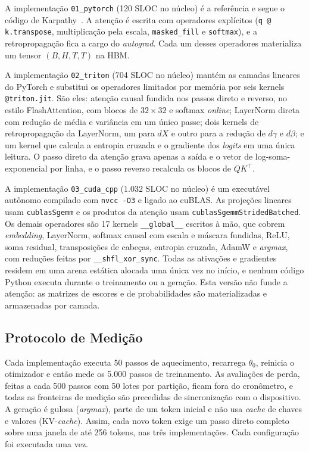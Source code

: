 \documentclass[conference]{IEEEtran}
\begin{document}
A implementação \texttt{01\_pytorch} (120 SLOC no núcleo) é a referência e segue o código de Karpathy~\cite{karpathy2023nanogpt}. A atenção é escrita com operadores explícitos (\texttt{q @ k.transpose}, multiplicação pela escala, \texttt{masked\_fill} e \texttt{softmax}), e a retropropagação fica a cargo do \textit{autograd}. Cada um desses operadores materializa um tensor $(B,H,T,T)$ na HBM.

A implementação \texttt{02\_triton} (704 SLOC no núcleo) mantém as camadas lineares do PyTorch e substitui os operadores limitados por memória por seis kernels \texttt{@triton.jit}. São eles: atenção causal fundida nos passos direto e reverso, no estilo FlashAttention, com blocos de $32 \times 32$ e softmax \textit{online}; LayerNorm direta com redução de média e variância em um único passe; dois kernels de retropropagação da LayerNorm, um para $dX$ e outro para a redução de $d\gamma$ e $d\beta$; e um kernel que calcula a entropia cruzada e o gradiente dos \textit{logits} em uma única leitura. O passo direto da atenção grava apenas a saída e o vetor de log-soma-exponencial por linha, e o passo reverso recalcula os blocos de $QK^\top$.

A implementação \texttt{03\_cuda\_cpp} (1.032 SLOC no núcleo) é um executável autônomo compilado com \texttt{nvcc -O3} e ligado ao cuBLAS. As projeções lineares usam \texttt{cublasSgemm} e os produtos da atenção usam \texttt{cublasSgemmStridedBatched}. Os demais operadores são 17 kernels \texttt{\_\_global\_\_} escritos à mão, que cobrem \textit{embedding}, LayerNorm, softmax causal com escala e máscara fundidas, ReLU, soma residual, transposições de cabeças, entropia cruzada, AdamW e \textit{argmax}, com reduções feitas por \texttt{\_\_shfl\_xor\_sync}. Todas as ativações e gradientes residem em uma arena estática alocada uma única vez no início, e nenhum código Python executa durante o treinamento ou a geração. Esta versão não funde a atenção: as matrizes de escores e de probabilidades são materializadas e armazenadas por camada.

\subsection{Protocolo de Medição}

Cada implementação executa 50 passos de aquecimento, recarrega $\theta_0$, reinicia o otimizador e então mede os 5.000 passos de treinamento. As avaliações de perda, feitas a cada 500 passos com 50 lotes por partição, ficam fora do cronômetro, e todas as fronteiras de medição são precedidas de sincronização com o dispositivo. A geração é gulosa (\textit{argmax}), parte de um token inicial e não usa \textit{cache} de chaves e valores (KV-\textit{cache}). Assim, cada novo token exige um passo direto completo sobre uma janela de até 256 tokens, nas três implementações. Cada configuração foi executada uma vez.
\end{document}
